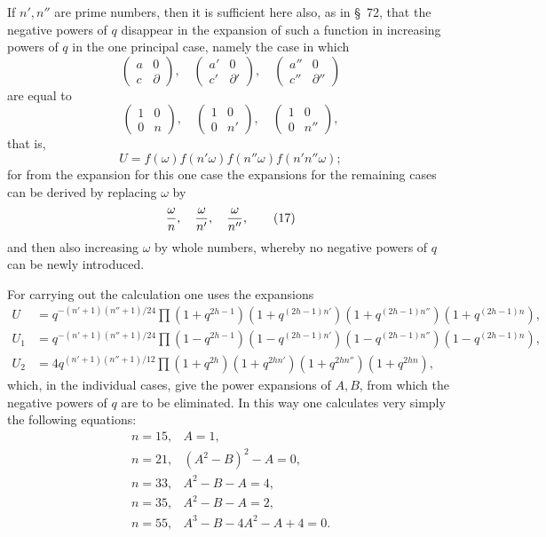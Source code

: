 \documentclass[11pt]{article}
\begin{document}
If $n',n''$ are prime numbers, then it is sufficient here also, as in \S~72, that the negative powers of $q$ disappear in the expansion of such a function in increasing powers of $q$ in the one principal case, namely the case in which
\[
 \begin{pmatrix}a&0\\ c&\partial\end{pmatrix},
 \quad
 \begin{pmatrix}a'&0\\ c'&\partial'\end{pmatrix},
 \quad
 \begin{pmatrix}a''&0\\ c''&\partial''\end{pmatrix}
\]
are equal to
\[
 \begin{pmatrix}1&0\\ 0&n\end{pmatrix},
 \quad
 \begin{pmatrix}1&0\\ 0&n'\end{pmatrix},
 \quad
 \begin{pmatrix}1&0\\ 0&n''\end{pmatrix},
\]
that is,
\[
 U=f(\omega)f(n'\omega)f(n''\omega)f(n'n''\omega);
\]
for from the expansion for this one case the expansions for the remaining cases can be derived by replacing $\omega$ by
\begin{equation}
 {\omega\over n},\quad {\omega\over n'},\quad {\omega\over n''},
\tag{17}
\end{equation}
and then also increasing $\omega$ by whole numbers, whereby no negative powers of $q$ can be newly introduced.

For carrying out the calculation one uses the expansions
\begin{equation}
\begin{aligned}
U&=q^{-(n'+1)(n''+1)/24}\prod(1+q^{2h-1})(1+q^{(2h-1)n'})(1+q^{(2h-1)n''})(1+q^{(2h-1)n}),\\
U_1&=q^{-(n'+1)(n''+1)/24}\prod(1-q^{2h-1})(1-q^{(2h-1)n'})(1-q^{(2h-1)n''})(1-q^{(2h-1)n}),\\
U_2&=4q^{(n'+1)(n''+1)/12}\prod(1+q^{2h})(1+q^{2hn'})(1+q^{2hn''})(1+q^{2hn}),
\end{aligned}
\tag{18}
\end{equation}
which, in the individual cases, give the power expansions of $A,B$, from which the negative powers of $q$ are to be eliminated. In this way one calculates very simply the following equations:
\begin{equation}
\begin{array}{rl}
n=15,& A=1,\\
n=21,& (A^2-B)^2-A=0,\\
n=33,& A^2-B-A=4,\\
n=35,& A^2-B-A=2,\\
n=55,& A^3-B-4A^2-A+4=0.
\end{array}
\tag{19}
\end{equation}
\end{document}
